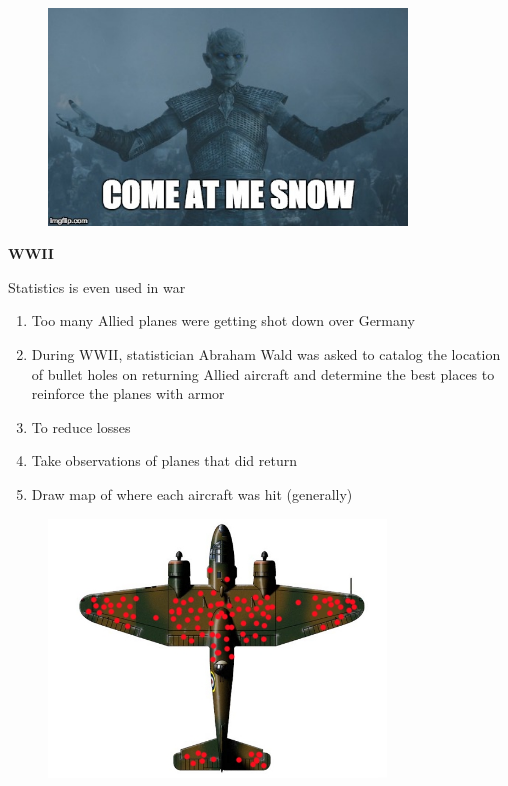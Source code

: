 \documentclass[aspectratio=1610,pdftex,dvipsnames,compress,xcolor={dvipsnames}]{beamer}
\begin{document}
\begin{frame}{}
    \begin{figure}
        \centering
        \includegraphics[width=0.85\textwidth]{walker.jpg}
    \end{figure}
\end{frame}


\begin{frame}[plain]{}
    \centering\LARGE\textbf{WWII}
\end{frame}


\addtocounter{framenumber}{-1}
\begin{frame}{Statistics is even used in war}
    \begin{enumerate}[series=outerlist,topsep=0pt,itemsep=21pt,leftmargin=*,label=(\arabic*)]
        \item[]Too many Allied planes were getting shot down over Germany
        \item[]During WWII, statistician Abraham Wald was asked to catalog the location of bullet holes on returning Allied aircraft and determine the best places to reinforce the planes with armor
        \item[]To reduce losses
        \item[]Take observations of planes that did return
        \item[]Draw map of where each aircraft was hit (generally)
    \end{enumerate}
\end{frame}


\begin{frame}{}
    \begin{figure}
        \centering
        \includegraphics[width=0.80\textwidth]{wwii.plane.jpg}
    \end{figure}
\end{frame}
\end{document}
